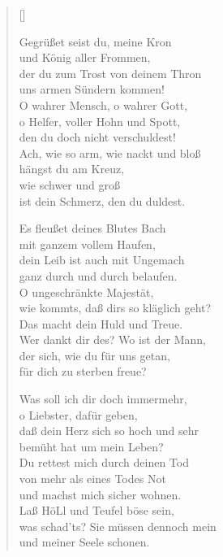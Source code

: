 \begin{multicols}{2}
\settowidth{\versewidth}{Was soll ich dir doch immermehr,}
\begin{verse}[\versewidth]


 Gegrüßet seist du, meine Kron\\
und König aller Frommen,\\
der du zum Trost von deinem Thron\\
uns armen Sündern kommen!\\
O wahrer Mensch, o wahrer Gott,\\
o Helfer, voller Hohn und Spott,\\
den du doch nicht verschuldest!\\
Ach, wie so arm, wie nackt und bloß\\
hängst du am Kreuz,\\
wie schwer und groß\\
ist dein Schmerz, den du duldest.

 Es fleußet deines Blutes Bach\\
mit ganzem vollem Haufen,\\
dein Leib ist auch mit Ungemach\\
ganz durch und durch belaufen.\\
O ungeschränkte Majestät,\\
wie kommts, daß dirs so kläglich geht?\\
Das macht dein Huld und Treue.\\
Wer dankt dir des? Wo ist der Mann,\\
der sich, wie du für uns getan,\\
für dich zu sterben freue?

 Was soll ich dir doch immermehr,\\
o Liebster, dafür geben,\\
daß dein Herz sich so hoch und sehr\\
bemüht hat um mein Leben?\\
Du rettest mich durch deinen Tod\\
von mehr als eines Todes Not\\
und machst mich sicher wohnen.\\
Laß HöLl und Teufel böse sein,\\
was schad'ts? Sie müssen dennoch mein\\
und meiner Seele schonen.


\end{verse}
\end{multicols}

